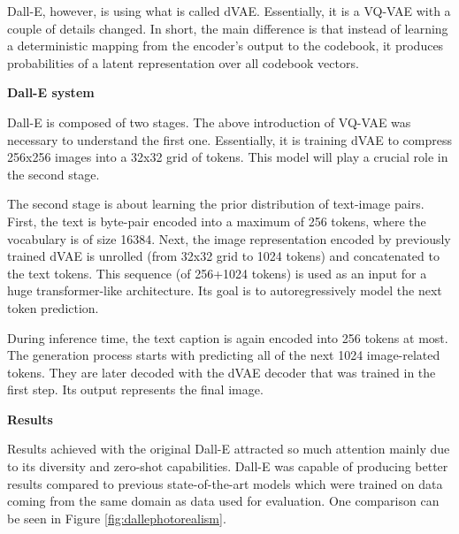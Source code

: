 \documentclass[
]{krantz}
\begin{document}
Dall-E, however, is using what is called dVAE. Essentially, it is a VQ-VAE with a couple of details changed. In short, the main difference is that instead of learning a deterministic mapping from the encoder's output to the codebook, it produces probabilities of a latent representation over all codebook vectors.

\textbf{Dall-E system}

Dall-E is composed of two stages. The above introduction of VQ-VAE was necessary to understand the first one. Essentially, it is training dVAE to compress 256x256 images into a 32x32 grid of tokens. This model will play a crucial role in the second stage.

The second stage is about learning the prior distribution of text-image pairs. First, the text is byte-pair \citep{BPE2015} encoded into a maximum of 256 tokens, where the vocabulary is of size 16384. Next, the image representation encoded by previously trained dVAE is unrolled (from 32x32 grid to 1024 tokens) and concatenated to the text tokens. This sequence (of 256+1024 tokens) is used as an input for a huge transformer-like architecture. Its goal is to autoregressively model the next token prediction.

During inference time, the text caption is again encoded into 256 tokens at most. The generation process starts with predicting all of the next 1024 image-related tokens. They are later decoded with the dVAE decoder that was trained in the first step. Its output represents the final image.

\textbf{Results}

Results achieved with the original Dall-E attracted so much attention mainly due to its diversity and zero-shot capabilities. Dall-E was capable of producing better results compared to previous state-of-the-art models which were trained on data coming from the same domain as data used for evaluation. One comparison can be seen in Figure \ref{fig:dallephotorealism}.
\end{document}
